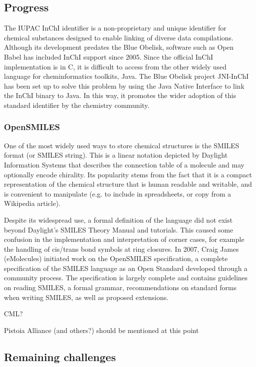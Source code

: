 \documentclass[10pt]{bmc_article}
\newenvironment{bmcformat}{\begin{raggedright}\baselineskip20pt\sloppy\setboolean{publ}{false}}{\end{raggedright}\baselineskip20pt\sloppy}
\begin{document}
\begin{bmcformat}
  \subsection*{Progress}

The IUPAC InChI identifier is a non-proprietary and unique identifier for chemical substances designed to enable linking of diverse data compilations. Although its development predates the Blue Obelisk, software such as Open Babel has included InChI support since 2005. Since the official InChI implementation is in C, it is difficult to access from the other widely used language for cheminformatics toolkits, Java. The Blue Obelisk project JNI-InChI has been set up to solve this problem by using the Java Native Interface to link the InChI binary to Java. In this way, it promotes the wider adoption of this standard identifier by the chemistry community.

    \subsubsection*{OpenSMILES}

One of the most widely used ways to store chemical structures is the
SMILES format (or SMILES string). This is a linear notation depicted
by Daylight Information Systems that describes the connection table
of a molecule and may optionally encode chirality. Its popularity
stems from the fact that it is a compact representation of the
chemical structure that is human readable and writable, and is
convenient to manipulate (e.g. to include in spreadsheets, or copy
from a Wikipedia article).

Despite its widespread use, a formal
definition of the language did not exist beyond Daylight's SMILES
Theory Manual and tutorials. This caused some confusion in the
implementation and interpretation of corner cases, for example the
handling of cis/trans bond symbols at ring closures. In 2007, Craig
James (eMolecules) initiated work on the OpenSMILES specification, a
complete specification of the SMILES language as an Open Standard
developed through a community process. The specification is largely
complete and contains guidelines on reading SMILES, a formal
grammar, recommendations on standard forms when writing SMILES, as
well as proposed extensions.

CML?

Pistoia Alliance (and others?) should be mentioned at this point

  \subsection*{Remaining challenges}


\end{bmcformat}
\end{document}
